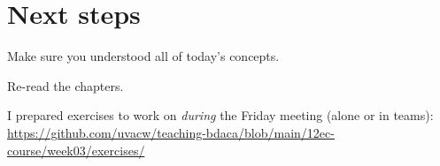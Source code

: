 
\section{Next steps}

\begin{frame}[standout]
Make sure you understood all of today's concepts.

Re-read the chapters.

I prepared exercises to work on \emph{during} the Friday meeting (alone or in teams):
\large{\url{https://github.com/uvacw/teaching-bdaca/blob/main/12ec-course/week03/exercises/}}
\end{frame}





\begin{frame}
	\printbibliography
\end{frame}




